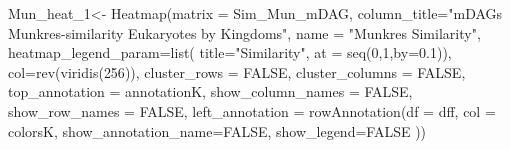 \documentclass[
  letterpaper,
  DIV=11,
  numbers=noendperiod]{scrreprt}
\newenvironment{Shaded}{}{}
\newcommand{\AttributeTok}[1]{\textcolor[rgb]{0.78,0.47,0.87}{#1}}
\newcommand{\ConstantTok}[1]{\textcolor[rgb]{0.82,0.60,0.40}{#1}}
\newcommand{\DecValTok}[1]{\textcolor[rgb]{0.82,0.60,0.40}{#1}}
\newcommand{\FloatTok}[1]{\textcolor[rgb]{0.82,0.60,0.40}{#1}}
\newcommand{\FunctionTok}[1]{\textcolor[rgb]{0.38,0.69,0.94}{#1}}
\newcommand{\NormalTok}[1]{\textcolor[rgb]{0.67,0.70,0.75}{#1}}
\newcommand{\OtherTok}[1]{\textcolor[rgb]{0.15,0.68,0.38}{#1}}
\newcommand{\StringTok}[1]{\textcolor[rgb]{0.60,0.76,0.47}{#1}}
\begin{document}
\begin{Shaded}
\begin{Highlighting}[]
\NormalTok{Mun\_heat\_1}\OtherTok{\textless{}{-}} \FunctionTok{Heatmap}\NormalTok{(}\AttributeTok{matrix =}\NormalTok{ Sim\_Mun\_mDAG, }
             \AttributeTok{column\_title=}\StringTok{"mDAGs Munkres{-}similarity  Eukaryotes by Kingdoms"}\NormalTok{,}
            \AttributeTok{name =} \StringTok{"Munkres Similarity"}\NormalTok{,}
            \AttributeTok{heatmap\_legend\_param=}\FunctionTok{list}\NormalTok{(}
                        \AttributeTok{title=}\StringTok{"Similarity"}\NormalTok{,}
                        \AttributeTok{at =} \FunctionTok{seq}\NormalTok{(}\DecValTok{0}\NormalTok{,}\DecValTok{1}\NormalTok{,}\AttributeTok{by=}\FloatTok{0.1}\NormalTok{)),}
                      \AttributeTok{col=}\FunctionTok{rev}\NormalTok{(}\FunctionTok{viridis}\NormalTok{(}\DecValTok{256}\NormalTok{)),}
                      \AttributeTok{cluster\_rows =} \ConstantTok{FALSE}\NormalTok{,}
                      \AttributeTok{cluster\_columns =} \ConstantTok{FALSE}\NormalTok{,}
                      \AttributeTok{top\_annotation =}\NormalTok{ annotationK,}
                      \AttributeTok{show\_column\_names =} \ConstantTok{FALSE}\NormalTok{, }
                      \AttributeTok{show\_row\_names =} \ConstantTok{FALSE}\NormalTok{,}
                      \AttributeTok{left\_annotation =}
                        \FunctionTok{rowAnnotation}\NormalTok{(}\AttributeTok{df =}\NormalTok{ dff,}
                                      \AttributeTok{col =}\NormalTok{ colorsK,}
                                    \AttributeTok{show\_annotation\_name=}\ConstantTok{FALSE}\NormalTok{,}
                                    \AttributeTok{show\_legend=}\ConstantTok{FALSE}
\NormalTok{                                      ))}
\end{Highlighting}
\end{Shaded}
\end{document}

